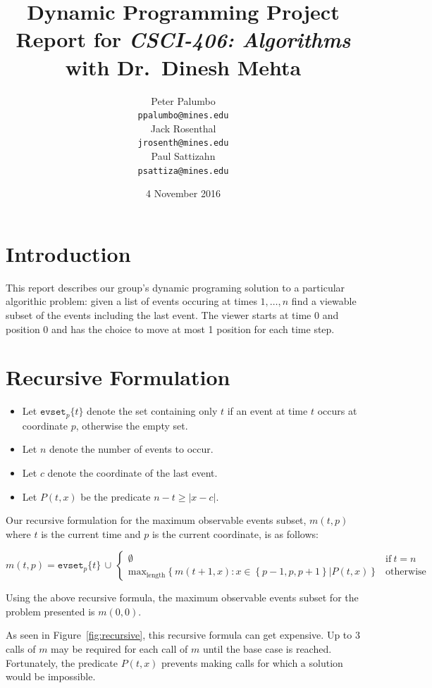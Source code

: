 \documentclass[titlepage,12pt]{article}
\title{\textbf{Dynamic Programming Project} \\ {\small Report for \emph{CSCI-406:
Algorithms} with Dr.~Dinesh Mehta}}
\author{%
    Peter Palumbo \\ {\small\texttt{ppalumbo@mines.edu}} \\[12pt]
    Jack Rosenthal \\ {\small\texttt{jrosenth@mines.edu}} \\[12pt]
    Paul Sattizahn \\ {\small\texttt{psattiza@mines.edu}} \\
}
\date{4 November 2016}
\let\ge=\geqslant
\begin{document}
\maketitle
\section{Introduction}

This report describes our group's dynamic programing solution to a particular
algorithic problem: given a list of events occuring at times $1,\ldots,n$ find
a viewable subset of the events including the last event. The viewer starts at
time 0 and position 0 and has the choice to move at most 1 position for each
time step.

\section{Recursive Formulation}

\begin{itemize}
    \item Let $\mathtt{evset}_p\{t\}$ denote the set containing only $t$ if an event
        at time $t$ occurs at coordinate $p$, otherwise the empty set.
    \item Let $n$ denote the number of events to occur.
    \item Let $c$ denote the coordinate of the last event.
    \item Let $P(t, x)$ be the predicate $n - t \ge |x - c|$.
\end{itemize}

Our recursive formulation for the maximum observable events subset, $m(t, p)$
where $t$ is the current time and $p$ is the current coordinate, is as
follows:

\begin{displaymath}
    m(t, p) = \mathtt{evset}_p\{t\}\, \cup\,
    \begin{cases}
        \emptyset & \text{if}\ t = n \\
        \text{max}_{\text{length}} \left\{m(t + 1, x) :
        x \in \left\{p - 1, p, p + 1\right\} | P(t, x)
        \right\} & \text{otherwise}
    \end{cases}
\end{displaymath}

Using the above recursive formula, the maximum observable events subset for the
problem presented is $m(0, 0)$.

As seen in Figure~\ref{fig:recursive}, this recursive formula can get
expensive. Up to 3 calls of $m$ may be required for each call of $m$ until the
base case is reached. Fortunately, the predicate $P(t, x)$ prevents making
calls for which a solution would be impossible.
\end{document}
